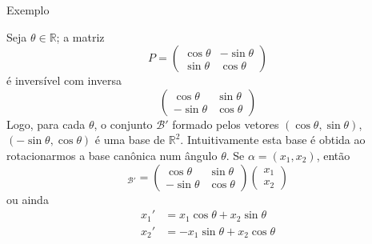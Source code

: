 \documentclass{beamer}
\begin{document}
\begin{darkframes}
\begin{frame}{Exemplo}
  \begin{footnotesize}
  Seja $\theta \in {\mathbb{R}}$; a matriz 
  \begin{equation*}
     P = 
     \begin{pmatrix}
        \cos{\theta} & -\sin{\theta}\\
        \sin{\theta} & \cos{\theta}
     \end{pmatrix}
  \end{equation*}
  é inversível com inversa
  \begin{equation*}
     \begin{pmatrix}
        \cos{\theta} & \sin{\theta}\\
        -\sin{\theta} & \cos{\theta}
     \end{pmatrix}
  \end{equation*}
  Logo, para cada $\theta$, o conjunto ${\mathcal{B}}'$ formado pelos vetores $(\cos{\theta}, \sin{\theta})$, $(-\sin{\theta}, \cos{\theta})$ é uma base de ${\mathbb{R}}^2$. Intuitivamente esta base é obtida ao rotacionarmos a base canônica num ângulo $\theta$. Se $\alpha =(x_1,x_2)$, então
  \begin{equation*}
     [\alpha]_{{\mathcal{B}}'} = 
     \begin{pmatrix}
        \cos{\theta} & \sin{\theta}\\
        -\sin{\theta} &\cos{\theta}
     \end{pmatrix}
     \begin{pmatrix}
        x_1\\x_2
     \end{pmatrix}
  \end{equation*}
  ou ainda
  \begin{align*}
    x_1' &= x_1\cos{\theta}+x_2\sin{\theta}\\
    x_2' &= -x_1\sin{\theta}+x_2\cos{\theta}      
  \end{align*}
\end{footnotesize}
\end{frame}

\end{darkframes}
\end{document}
